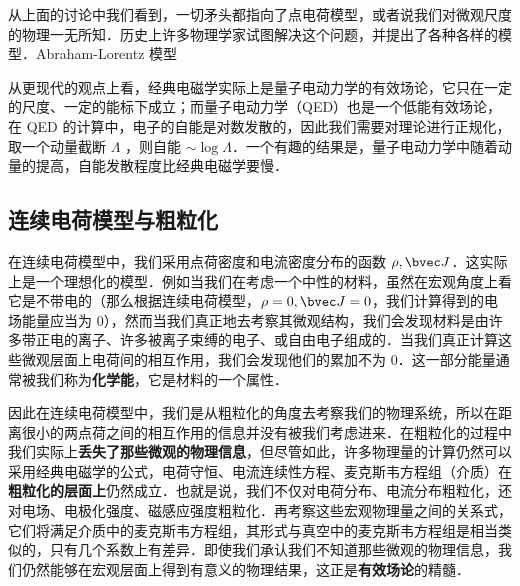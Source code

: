 从上面的讨论中我们看到，一切矛头都指向了点电荷模型，或者说我们对微观尺度的物理一无所知．历史上许多物理学家试图解决这个问题，并提出了各种各样的模型．Abraham-Lorentz 模型


从更现代的观点上看，经典电磁学实际上是量子电动力学的有效场论，它只在一定的尺度、一定的能标下成立；而量子电动力学（QED）也是一个低能有效场论，在 QED 的计算中，电子的自能是对数发散的，因此我们需要对理论进行正规化，取一个动量截断 $\Lambda$ ，则自能 $\sim \log \Lambda$．一个有趣的结果是，量子电动力学中随着动量的提高，自能发散程度比经典电磁学要慢．

\subsection{连续电荷模型与粗粒化}
在连续电荷模型中，我们采用点荷密度和电流密度分布的函数 $\rho,\bvec J$．这实际上是一个理想化的模型．例如当我们在考虑一个中性的材料，虽然在宏观角度上看它是不带电的（那么根据连续电荷模型，$\rho=0,\bvec J=0$，我们计算得到的电场能量应当为 $0$），然而当我们真正地去考察其微观结构，我们会发现材料是由许多带正电的离子、许多被离子束缚的电子、或自由电子组成的．当我们真正计算这些微观层面上电荷间的相互作用，我们会发现他们的累加不为 $0$．这一部分能量通常被我们称为\textbf{化学能}，它是材料的一个属性．

因此在连续电荷模型中，我们是从粗粒化的角度去考察我们的物理系统，所以在距离很小的两点荷之间的相互作用的信息并没有被我们考虑进来．在粗粒化的过程中我们实际上\textbf{丢失了那些微观的物理信息}，但尽管如此，许多物理量的计算仍然可以采用经典电磁学的公式，电荷守恒、电流连续性方程、麦克斯韦方程组（介质）在\textbf{粗粒化的层面上}仍然成立．也就是说，我们不仅对电荷分布、电流分布粗粒化，还对电场、电极化强度、磁感应强度粗粒化．再考察这些宏观物理量之间的关系式，它们将满足介质中的麦克斯韦方程组，其形式与真空中的麦克斯韦方程组是相当类似的，只有几个系数上有差异．即使我们承认我们不知道那些微观的物理信息，我们仍然能够在宏观层面上得到有意义的物理结果，这正是\textbf{有效场论}的精髓．